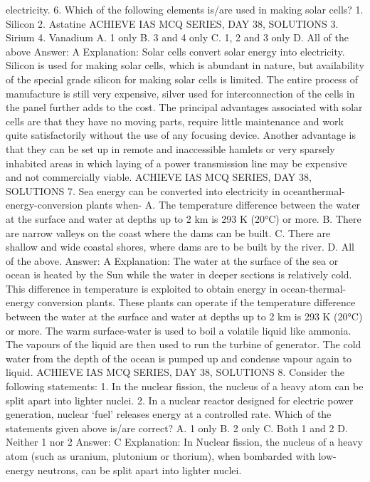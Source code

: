 electricity.
6. Which of the following elements is/are used in making solar
cells?
1. Silicon
2. Astatine
ACHIEVE IAS MCQ SERIES, DAY 38, SOLUTIONS
3. Sirium
4. Vanadium
A. 1 only
B. 3 and 4 only
C. 1, 2 and 3 only
D. All of the above
Answer: A
Explanation: Solar cells convert solar energy into electricity.
Silicon is used for making solar cells, which is abundant in nature,
but availability of the special grade silicon for making solar cells is
limited.
The entire process of manufacture is still very expensive, silver
used for interconnection of the cells in the panel further adds to
the cost.
The principal advantages associated with solar cells are that they
have no moving parts, require little maintenance and work quite
satisfactorily without the use of any focusing device.
Another advantage is that they can be set up in remote and
inaccessible hamlets or very sparsely inhabited areas in which laying
of a power transmission line may be expensive and not commercially
viable.
ACHIEVE IAS MCQ SERIES, DAY 38, SOLUTIONS
7. Sea energy can be converted into electricity in oceanthermal-energy-conversion plants when-
A. The temperature difference between the water at the surface
and water at depths up to 2 km is 293 K (20°C) or more.
B. There are narrow valleys on the coast where the dams can be
built.
C. There are shallow and wide coastal shores, where dams are to be
built by the river.
D. All of the above.
Answer: A
Explanation: The water at the surface of the sea or ocean is
heated by the Sun while the water in deeper sections is relatively
cold.
This difference in temperature is exploited to obtain energy in
ocean-thermal-energy conversion plants.
These plants can operate if the temperature difference between
the water at the surface and water at depths up to 2 km is 293 K
(20°C) or more.
The warm surface-water is used to boil a volatile liquid like ammonia.
The vapours of the liquid are then used to run the turbine of
generator. The cold water from the depth of the ocean is pumped up
and condense vapour again to liquid.
ACHIEVE IAS MCQ SERIES, DAY 38, SOLUTIONS
8. Consider the following statements:
1. In the nuclear fission, the nucleus of a heavy atom can be split
apart into lighter nuclei.
2. In a nuclear reactor designed for electric power generation,
nuclear ‘fuel’ releases energy at a controlled rate.
Which of the statements given above is/are correct?
A. 1 only
B. 2 only
C. Both 1 and 2
D. Neither 1 nor 2
Answer: C
Explanation: In Nuclear fission, the nucleus of a heavy atom (such
as uranium, plutonium or thorium), when bombarded with low-energy
neutrons, can be split apart into lighter nuclei.
